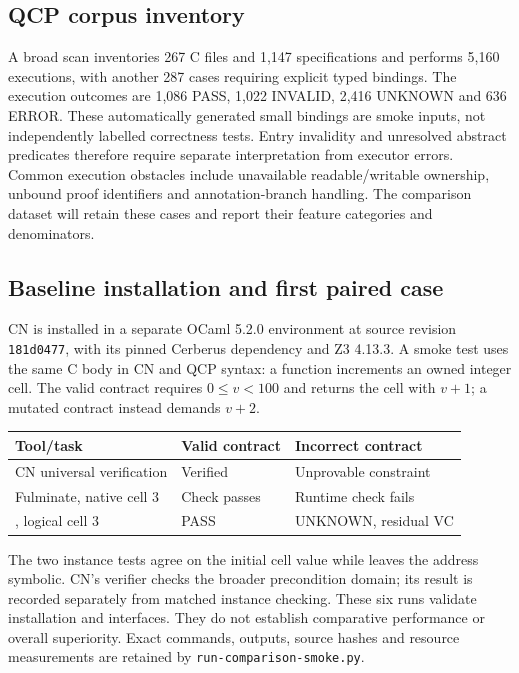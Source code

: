 \subsection{QCP corpus inventory}

A broad scan inventories 267 C files and 1,147 specifications and performs
5,160 executions, with another 287 cases requiring explicit typed bindings.
The execution outcomes are 1,086 PASS, 1,022 INVALID, 2,416 UNKNOWN and 636 ERROR.
These automatically generated small bindings are smoke inputs, not independently
labelled correctness tests. Entry invalidity and unresolved abstract predicates
therefore require separate interpretation from executor errors. Common execution
obstacles include unavailable readable/writable ownership, unbound proof
identifiers and annotation-branch handling. The comparison dataset will retain
these cases and report their feature categories and denominators.

\subsection{Baseline installation and first paired case}

CN is installed in a separate OCaml 5.2.0 environment at source revision
\texttt{181d0477}, with its pinned Cerberus dependency and Z3 4.13.3.
A smoke test uses the same C body in CN and QCP syntax: a function increments
an owned integer cell. The valid contract requires $0\leq v<100$ and returns
the cell with $v+1$; a mutated contract instead demands $v+2$.

\begin{center}
\small
\begin{tabular}{lll}
\toprule
Tool/task & Valid contract & Incorrect contract\\
\midrule
CN universal verification & Verified & Unprovable constraint\\
Fulminate, native cell $3$ & Check passes & Runtime check fails\\
\tespec{}, logical cell $3$ & PASS & UNKNOWN, residual VC\\
\bottomrule
\end{tabular}
\end{center}

The two instance tests agree on the initial cell value while \tespec{} leaves
the address symbolic. CN's verifier checks the broader precondition domain;
its result is recorded separately from matched instance checking. These six
runs validate installation and interfaces. They do not establish comparative
performance or overall superiority. Exact commands, outputs, source hashes and
resource measurements are retained by \texttt{run-comparison-smoke.py}.

